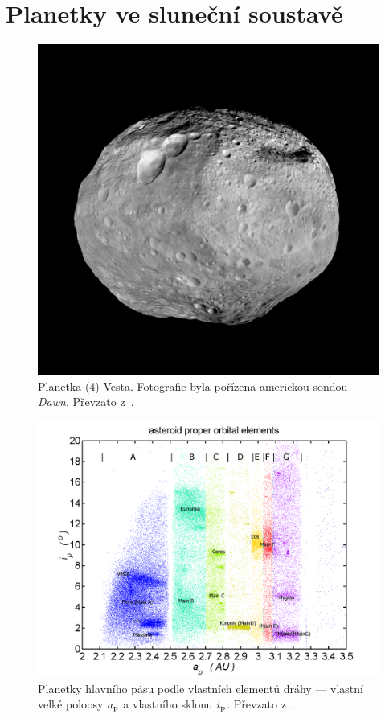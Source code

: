 \documentclass[xcolor=dvipsnames]{beamer}
\begin{document}
\section{Planetky ve sluneční soustavě}
\begin{frame}{\secname}
\begin{figure}
\centering
\includegraphics[height=0.7\textheight,width=\textwidth,keepaspectratio]{../obr/vesta.jpg}
\caption{\footnotesize{Planetka (4) Vesta. Fotografie byla pořízena americkou sondou \textit{Dawn}. Převzato z~\textcite{jplvesta}.}}
\end{figure}
\end{frame}

\begin{frame}{\secname}
\begin{figure}
\centering
\includegraphics[height=0.7\textheight,width=\textwidth,keepaspectratio]{../obr/mainbelt.png}
\caption{\footnotesize{Planetky hlavního pásu podle vlastních elementů dráhy --- vlastní velké poloosy $a_{\rm p}$ a vlastního sklonu $i_{\rm p}$. Převzato z~\cite{wiki:belt}.}}
\end{figure}
\end{frame}
\end{document}
